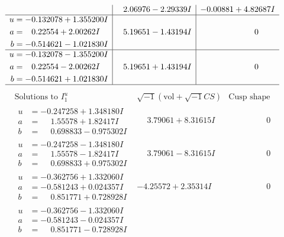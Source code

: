 \documentclass[1p]{elsarticle_modified}
\theoremstyle{definition}
\newcommand{\I}{\sqrt{-1}}
\begin{document}
$$\begin{array}{c|c|c}
 & \phantom{-}2.06976 - 2.29339 I & -0.00881 + 4.82687 I \\ \hline\begin{aligned}
u &= -0.132078 + 1.355200 I \\
a &= \phantom{-}0.22554 + 2.00262 I \\
b &= -0.514621 - 1.021830 I\end{aligned}
 & \phantom{-}5.19651 - 1.43194 I & \phantom{-0.000000 } 0 \\ \hline\begin{aligned}
u &= -0.132078 - 1.355200 I \\
a &= \phantom{-}0.22554 - 2.00262 I \\
b &= -0.514621 + 1.021830 I\end{aligned}
 & \phantom{-}5.19651 + 1.43194 I & \phantom{-0.000000 } 0\\
 \hline 
 \end{array}$$\newpage$$\begin{array}{c|c|c}  
\text{Solutions to }I^u_{1}& \I (\text{vol} + \sqrt{-1}CS) & \text{Cusp shape}\\
 \hline 
\begin{aligned}
u &= -0.247258 + 1.348180 I \\
a &= \phantom{-}1.55578 + 1.82417 I \\
b &= \phantom{-}0.698833 - 0.975302 I\end{aligned}
 & \phantom{-}3.79061 + 8.31615 I & \phantom{-0.000000 } 0 \\ \hline\begin{aligned}
u &= -0.247258 - 1.348180 I \\
a &= \phantom{-}1.55578 - 1.82417 I \\
b &= \phantom{-}0.698833 + 0.975302 I\end{aligned}
 & \phantom{-}3.79061 - 8.31615 I & \phantom{-0.000000 } 0 \\ \hline\begin{aligned}
u &= -0.362756 + 1.332060 I \\
a &= -0.581243 + 0.024357 I \\
b &= \phantom{-}0.851771 + 0.728928 I\end{aligned}
 & -4.25572 + 2.35314 I & \phantom{-0.000000 } 0 \\ \hline\begin{aligned}
u &= -0.362756 - 1.332060 I \\
a &= -0.581243 - 0.024357 I \\
b &= \phantom{-}0.851771 - 0.728928 I\end{aligned}

\end{array}$$
\end{document}
